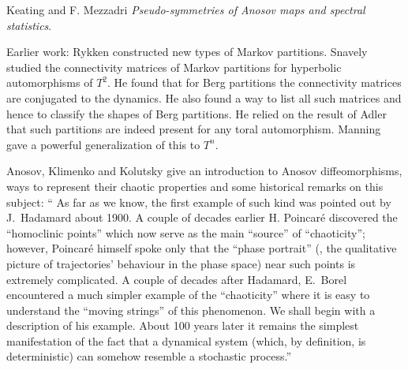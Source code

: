 Keating and F. Mezzadri {\em Pseudo-symmetries of {Anosov}
maps and spectral statistics}.

Earlier work:
Rykken constructed new types of Markov partitions.
Snavely studied the connectivity matrices of Markov partitions
for hyperbolic automorphisms of $T^2$. He found that for Berg partitions the
connectivity matrices are conjugated to the dynamics. He also found a way to
list all such matrices and hence to classify the shapes of Berg partitions. He
relied on the result of Adler that such partitions are indeed
present for any toral automorphism.
Manning gave a powerful generalization of this to $T^n$.

                                                    \toCB
Anosov, Klimenko and Kolutsky give an introduction to Anosov
diffeomorphisms, ways to represent their chaotic properties and some historical
remarks on this subject:
`` As far as we know, the first example of such kind was
pointed out by J.~Hadamard about 1900. A couple of decades earlier H. Poincar\'e
discovered the ``homoclinic points'' which now serve as
the main ``source'' of ``chaoticity''; however, Poincar\'e himself spoke only
that the ``phase portrait'' (\ie, the qualitative picture of trajectories'
behaviour in the phase space) near such points is extremely complicated.
A couple of decades after Hadamard, E.~Borel encountered a much simpler
example of the ``chaoticity'' where it is easy to
understand the ``moving strings'' of this phenomenon. We shall begin with
a description of his example. About 100 years later it remains the simplest
manifestation of the fact that a dynamical system (which, by definition, is
deterministic) can somehow resemble a stochastic process.''






